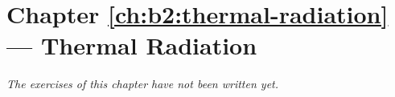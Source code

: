 \section*{Chapter \ref{ch:b2:thermal-radiation} --- Thermal Radiation}


\emph{The exercises of this chapter have not been written yet.}
